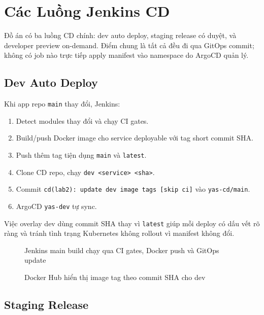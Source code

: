 \section{Các Luồng Jenkins CD}

Đồ án có ba luồng CD chính: dev auto deploy, staging release có duyệt, và
developer preview on-demand. Điểm chung là tất cả đều đi qua GitOps commit; không
có job nào trực tiếp apply manifest vào namespace do ArgoCD quản lý.

\subsection{Dev Auto Deploy}

Khi app repo \texttt{main} thay đổi, Jenkins:

\begin{enumerate}
    \item Detect modules thay đổi và chạy CI gates.
    \item Build/push Docker image cho service deployable với tag short commit SHA.
    \item Push thêm tag tiện dụng \texttt{main} và \texttt{latest}.
    \item Clone CD repo, chạy  \texttt{dev <service> <sha>}.
    \item Commit \texttt{cd(lab2): update dev image tags [skip ci]} vào \texttt{yas-cd/main}.
    \item ArgoCD \texttt{yas-dev} tự sync.
\end{enumerate}

Việc overlay dev dùng commit SHA thay vì \texttt{latest} giúp mỗi deploy có dấu vết
rõ ràng và tránh tình trạng Kubernetes không rollout vì manifest không đổi.

\begin{figure}[H]
\centering
{}
\caption{Jenkins main build chạy qua CI gates, Docker push và GitOps update}
\end{figure}

\begin{figure}[H]
\centering
{}
\caption{Docker Hub hiển thị image tag theo commit SHA cho dev}
\end{figure}

\subsection{Staging Release}

